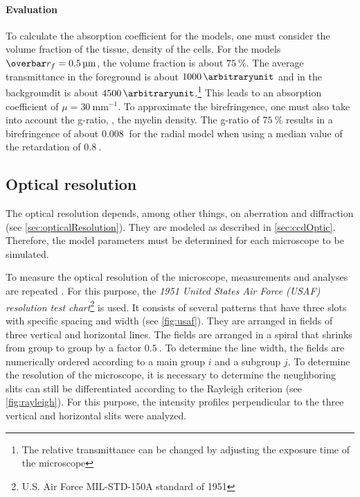 \paragraph{Evaluation}
To calculate the absorption coefficient for the models, one must consider the volume fraction of the tissue, \ie{} density of the cells.
For the models $\fiberRadiusMean = \SI{0.5}{\micro\meter}$, the volume fraction is about $\SI{75}{\percent}$.
The average transmittance in the foreground is about $\SI{1000}{\arbitraryunit}$ and in the backgroundit is about $\SI{4500}{\arbitraryunit}$.\footnote{The relative transmittance can be changed by adjusting the exposure time of the microscope}
This leads to an absorption coefficient of $\mu = \SI{30}{\milli\meter\tothe{-1}}$.
To approximate the birefringence, one must also take into account the g-ratio, \ie{}, the myelin density.
The g-ratio of $\SI{75}{\percent}$ results in a birefringence of about $\SI{0.008}{}$ for the radial model when using a median value of the retardation of $\SI{0.8}{}$.
%
% 
% 
\subsection{Optical resolution}
%
The optical resolution depends, among other things, on aberration and diffraction (see \cref{sec:opticalResolution}).
They are modeled as described in \cref{sec:ccdOptic}.
Therefore, the model parameters must be determined for each microscope to be simulated.
\par
%
To measure the optical resolution of the microscope, measurements and analyses are repeated \cite{MenzelMaster}.
For this purpose, the \textit{1951 United States Air Force (USAF) resolution test chart}\footnote{U.S. Air Force MIL-STD-150A standard of 1951} is used.
It consists of several patterns that have three slots with specific spacing and width (see \cref{fig:usaf}).
They are arranged in fields of three vertical and horizontal lines.
The fields are arranged in a spiral that shrinks from group to group by a factor $\SI{0.5}{}$.
To determine the line width, the fields are numerically ordered according to a main group $i$ and a subgroup $j$.
To determine the resolution of the microscope, it is necessary to determine the neughboring slits can still be differentiated according to the Rayleigh criterion (see \cref{fig:rayleigh}).
For this purpose, the intensity profiles perpendicular to the three vertical and horizontal slits were analyzed.
% 
% 
% 
